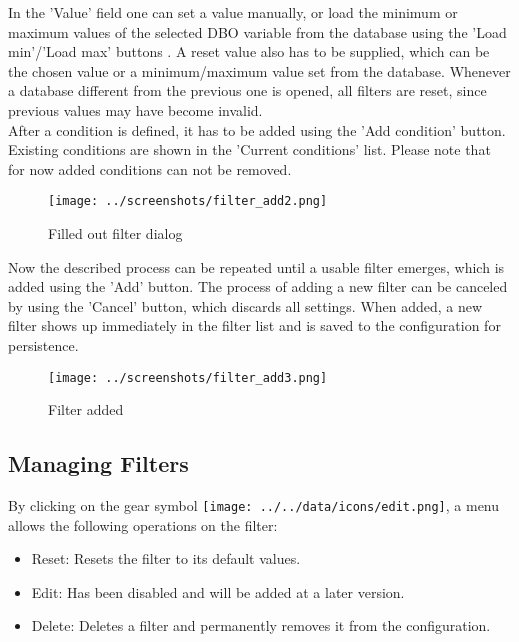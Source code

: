 In the 'Value' field one can set a value manually, or load the minimum or maximum values of the selected DBO variable from the database using the 'Load min'/'Load max' buttons . A reset value also has to be supplied, which can be the chosen value or a minimum/maximum value set from the database.  Whenever a database different from the previous one is opened, all filters are reset, since previous values may have become invalid.\\

After a condition is defined, it has to be added using the 'Add condition' button. Existing conditions are shown in the 'Current conditions' list. Please note that for now added conditions can not be removed.

\begin{figure}[H]
  \center
    \texttt{[image: ../screenshots/filter\_add2.png]}
  \caption{Filled out filter dialog}
  \label{fig:filter_add2}
\end{figure}

Now the described process can be repeated until a usable filter emerges, which is added using the 'Add'
button. The process of adding a new filter can be canceled by using the 'Cancel' button, which discards all
settings. When added, a new filter shows up immediately in the filter list and is saved to the configuration
for persistence.

\begin{figure}[H]
  \center
    \texttt{[image: ../screenshots/filter\_add3.png]}
  \caption{Filter added}
  \label{fig:filter_add3}
\end{figure}

\subsection{Managing Filters}
\label{sec:filter_management}

By clicking on the gear symbol \texttt{[image: ../../data/icons/edit.png]}, a menu allows the following operations on the filter:

\begin{itemize}  
\item Reset: Resets the filter to its default values.
\item Edit: Has been disabled and will be added at a later version.
\item Delete: Deletes a filter and permanently removes it from the configuration.
\end{itemize}
 
